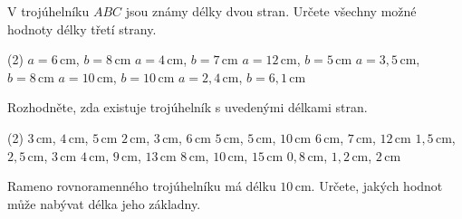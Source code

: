 \documentclass[12pt,a4paper]{article}
\begin{document}

\begin{exercise}

    V trojúhelníku $ABC$ jsou známy délky dvou stran. Určete všechny možné hodnoty
    délky třetí strany.

    \begin{tasks}(2)
        \task $a=6\,\mathrm{cm}$, $b=8\,\mathrm{cm}$
        \task $a=4\,\mathrm{cm}$, $b=7\,\mathrm{cm}$
        \task $a=12\,\mathrm{cm}$, $b=5\,\mathrm{cm}$
        \task $a=3{,}5\,\mathrm{cm}$, $b=8\,\mathrm{cm}$
        \task $a=10\,\mathrm{cm}$, $b=10\,\mathrm{cm}$
        \task $a=2{,}4\,\mathrm{cm}$, $b=6{,}1\,\mathrm{cm}$
    \end{tasks}

\end{exercise}



\begin{exercise}

    Rozhodněte, zda existuje trojúhelník s uvedenými délkami stran.

    \begin{tasks}(2)
        \task $3\,\mathrm{cm}$, $4\,\mathrm{cm}$, $5\,\mathrm{cm}$
        \task $2\,\mathrm{cm}$, $3\,\mathrm{cm}$, $6\,\mathrm{cm}$
        \task $5\,\mathrm{cm}$, $5\,\mathrm{cm}$, $10\,\mathrm{cm}$
        \task $6\,\mathrm{cm}$, $7\,\mathrm{cm}$, $12\,\mathrm{cm}$
        \task $1{,}5\,\mathrm{cm}$, $2{,}5\,\mathrm{cm}$, $3\,\mathrm{cm}$
        \task $4\,\mathrm{cm}$, $9\,\mathrm{cm}$, $13\,\mathrm{cm}$
        \task $8\,\mathrm{cm}$, $10\,\mathrm{cm}$, $15\,\mathrm{cm}$
        \task $0{,}8\,\mathrm{cm}$, $1{,}2\,\mathrm{cm}$, $2\,\mathrm{cm}$
    \end{tasks}

\end{exercise}



\begin{exercise}

    Rameno rovnoramenného trojúhelníku má délku $10\,\mathrm{cm}$.
    Určete, jakých hodnot může nabývat délka jeho základny.

\end{exercise}
\end{document}
